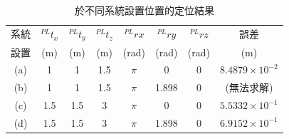 \begin{table}[htpb]
    \begin{center}
      \caption{於不同系統設置位置的定位結果}
      \label{tab:pos_error_result}
      \begin{tabular}{c||c|c|c|c|c|c||c} %
         系統& $^{PL}t_x$ & $^{PL}t_y$&$^{PL}t_z$&$ ^{PL}rx$ & $^{PL}ry$&$^{PL}rz$&誤差\\
         設置& (m) & (m)&(m)&(rad) & (rad)&(rad)&(m)\\
        \hline
        (a)& 1 & 1&1.5&$\pi$ & 0&0&$8.4879\times 10^{-2}$\\
        (b)& 1 & 1&1.5&$\pi$ & 1.898&0&(無法求解)\\
        (c)& 1.5 & 1.5&3&$\pi$ & 0&0&$5.5332\times 10^{-1}$\\
        (d)& 1.5 & 1.5&3&$\pi$ & 1.898&0&$6.9152\times 10^{-1}$\\
      \end{tabular}
    \end{center}
  \end{table}

  

